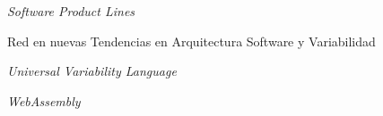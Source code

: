 \begin{description}[
    labelwidth=2.5cm,
    leftmargin=3cm,
    style=nextline,
    itemsep=0.3em
  ]
  \item[\textbf{SPL}] \textit{Software Product Lines}
  \item[\textbf{TASOVA}] Red en nuevas Tendencias en Arquitectura Software y Variabilidad
  \item[\textbf{UVL}] \textit{Universal Variability Language}
  \item[\textbf{WASM}] \textit{WebAssembly}
\end{description}